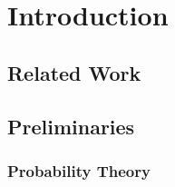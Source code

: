 \chapter{Introduction}

\section{Related Work}


\section{Preliminaries}


\subsection{Probability Theory}

